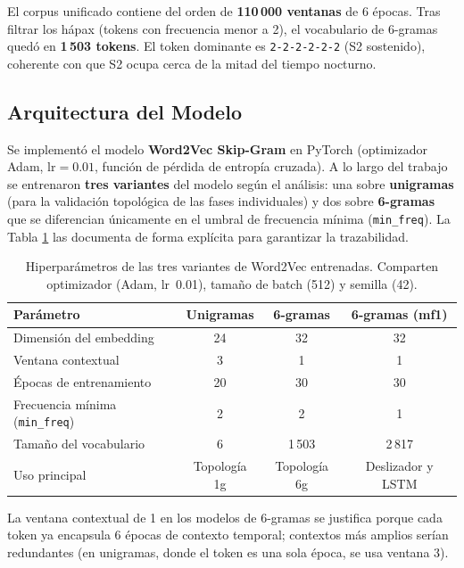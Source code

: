 El corpus unificado contiene del orden de \textbf{110\,000 ventanas} de 6 épocas. Tras filtrar los hápax (tokens con frecuencia menor a 2), el vocabulario de 6-gramas quedó en \textbf{1\,503 tokens}. El token dominante es \texttt{2-2-2-2-2-2} (S2 sostenido), coherente con que S2 ocupa cerca de la mitad del tiempo nocturno.

\subsection{Arquitectura del Modelo}

Se implementó el modelo \textbf{Word2Vec Skip-Gram} \citep{mikolov2013efficient} en PyTorch (optimizador Adam, $\text{lr}=0.01$, función de pérdida de entropía cruzada). A lo largo del trabajo se entrenaron \textbf{tres variantes} del modelo según el análisis: una sobre \textbf{unigramas} (para la validación topológica de las fases individuales) y dos sobre \textbf{6-gramas} que se diferencian únicamente en el umbral de frecuencia mínima (\texttt{min\_freq}). La Tabla \ref{tab:hiperparametros_w2v} las documenta de forma explícita para garantizar la trazabilidad.

\begin{table}[htbp]
\centering
\caption{Hiperparámetros de las tres variantes de Word2Vec entrenadas. Comparten optimizador (Adam, lr~0.01), tamaño de batch (512) y semilla (42).}
\label{tab:hiperparametros_w2v}
\footnotesize\setlength{\tabcolsep}{4pt}%
\begin{tabular}{lccc}
\hline
\textbf{Parámetro} & \textbf{Unigramas} & \textbf{6-gramas} & \textbf{6-gramas (mf1)} \\
\hline
Dimensión del embedding & 24 & 32 & 32 \\
Ventana contextual & 3 & 1 & 1 \\
Épocas de entrenamiento & 20 & 30 & 30 \\
Frecuencia mínima (\texttt{min\_freq}) & 2 & 2 & 1 \\
Tamaño del vocabulario & 6 & 1\,503 & 2\,817 \\
Uso principal & Topología 1g & Topología 6g & Deslizador y LSTM \\
\hline
\end{tabular}
\end{table}

La ventana contextual de 1 en los modelos de 6-gramas se justifica porque cada token ya encapsula 6 épocas de contexto temporal; contextos más amplios serían redundantes (en unigramas, donde el token es una sola época, se usa ventana 3).

